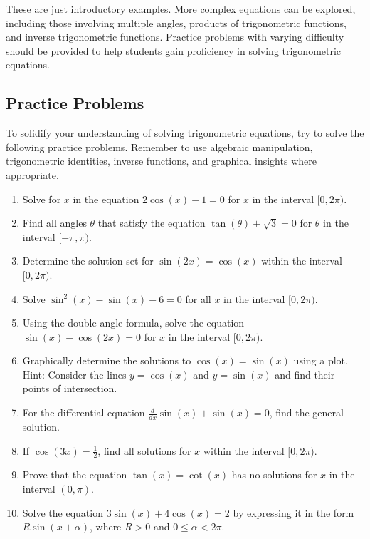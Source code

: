 \documentclass[a4paper,12pt]{book}
\newcounter{problem}
\newcounter{example}
\begin{document}
These are just introductory examples. More complex equations can be explored, including those involving multiple angles, products of trigonometric functions, and inverse trigonometric functions. Practice problems with varying difficulty should be provided to help students gain proficiency in solving trigonometric equations.

\subsection{Practice Problems}
\label{subsec:practice_problems}

To solidify your understanding of solving trigonometric equations, try to solve the following practice problems. Remember to use algebraic manipulation, trigonometric identities, inverse functions, and graphical insights where appropriate.

\begin{enumerate}
    \item Solve for \( x \) in the equation \( 2\cos(x) - 1 = 0 \) for \( x \) in the interval \( [0, 2\pi) \).
    \item Find all angles \( \theta \) that satisfy the equation \( \tan(\theta) + \sqrt{3} = 0 \) for \( \theta \) in the interval \( [-\pi, \pi) \).
    \item Determine the solution set for \( \sin(2x) = \cos(x) \) within the interval \( [0, 2\pi) \).
    \item Solve \( \sin^2(x) - \sin(x) - 6 = 0 \) for all \( x \) in the interval \( [0, 2\pi) \).
    \item Using the double-angle formula, solve the equation \( \sin(x) - \cos(2x) = 0 \) for \( x \) in the interval \( [0, 2\pi) \).
    \item Graphically determine the solutions to \( \cos(x) = \sin(x) \) using a plot. Hint: Consider the lines \( y = \cos(x) \) and \( y = \sin(x) \) and find their points of intersection.
    \item For the differential equation \( \frac{d}{dx}\sin(x) + \sin(x) = 0 \), find the general solution.
    \item If \( \cos(3x) = \frac{1}{2} \), find all solutions for \( x \) within the interval \( [0, 2\pi) \).
    \item Prove that the equation \( \tan(x) = \cot(x) \) has no solutions for \( x \) in the interval \( (0, \pi) \).
    \item Solve the equation \( 3\sin(x) + 4\cos(x) = 2 \) by expressing it in the form \( R\sin(x + \alpha) \), where \( R > 0 \) and \( 0 \leq \alpha < 2\pi \).
\end{enumerate}
\end{document}
